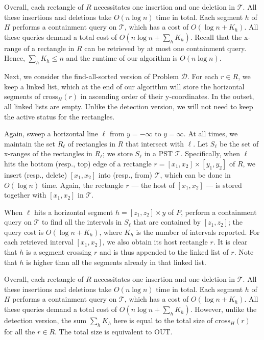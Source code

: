 \documentclass[acmsmall,review,anonymous]{acmart}
\def\vgap{\vspace{1mm}}
\def\T{\mathcal{T}}
\def\cross{\mathrm{cross}}
\def\out{\mathrm{OUT}}
\begin{document}
{{{\vgap

Overall, each rectangle of $R$ necessitates one insertion and one deletion in $\T$. All these insertions and deletions take $O(n \log n)$ time in total. Each segment $h$ of $H$ performs a containment query on $\T$, which has a cost of $O(\log n + K_h)$. All these queries demand a total cost of $O(n \log n + \sum_h K_h)$. Recall that the x-range of a rectangle in $R$ can be retrieved by at most one containment query. Hence, $\sum_h K_h \le n$ and the runtime of our algorithm is $O(n \log n)$.

\vgap

Next, we consider the find-all-sorted version of Problem $\mathscr{D}$. For each $r \in R$, we keep a linked list, which at the end of our algorithm will store the horizontal segments of $\cross_H(r)$ in ascending order of their y-coordinates. In the outset, all linked lists are empty. Unlike the detection version, we will not need to keep the active status for the rectangles.

\vgap

Again, sweep a horizontal line $\ell$ from $y = -\infty$ to $y = \infty$. At all times, we maintain the set $R_\ell$ of rectangles in $R$ that intersect with $\ell$. Let $S_\ell$ be the set of x-ranges of the rectangles in $R_\ell$; we store $S_\ell$ in a PST $\T$. Specifically, when $\ell$ hits the bottom (resp., top) edge of a rectangle $r = [x_1, x_2] \times [y_1, y_2]$ of $R$, we insert (resp., delete) $[x_1, x_2]$ into (resp., from) $\T$, which can be done in $O(\log n)$ time. Again, the rectangle $r$ --- the host of $[x_1, x_2]$ --- is stored together with $[x_1, x_2]$ in $\T$.

\vgap

When $\ell$ hits a horizontal segment $h = [z_1, z_2] \times y$ of $P$, perform a containment query on $\T$ to find all the intervals in $S_\ell$ that are contained by $[z_1, z_2]$; the query cost is $O(\log n + K_h)$, where $K_h$ is the number of intervals reported. For each retrieved interval $[x_1, x_2]$, we also obtain its host rectangle $r$. It is clear that $h$ is a segment crossing $r$ and is thus appended to the linked list of $r$. Note that $h$ is higher than all the segments already in that linked list.

\vgap

Overall, each rectangle of $R$ necessitates one insertion and one deletion in $\T$. All these insertions and deletions take $O(n \log n)$ time in total. Each segment $h$ of $H$ performs a containment query on $\T$, which has a cost of $O(\log n + K_h)$. All these queries demand a total cost of $O(n \log n + \sum_h K_h)$. However, unlike the detection version, the sum $\sum_h K_h$ here is equal to the total size of $\cross_H(r)$ for all the $r \in R$. The total size is equivalent to $\out$.


}}}
\end{document}
